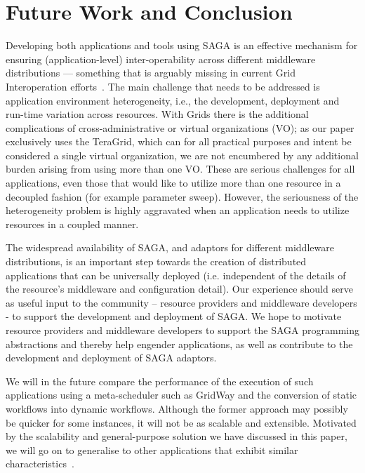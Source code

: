 \documentclass[conference,final]{IEEEtran}
\newcommand{\jha}[0]{}
\begin{document}

\section{Future Work and Conclusion}

Developing both applications and tools using SAGA is an effective
mechanism for ensuring (application-level) inter-operability across
different middleware distributions --- something that is arguably
missing in current Grid Interoperation efforts~\cite{gin_paper}. The
main challenge that needs to be addressed is application environment
heterogeneity, i.e., the development, deployment and run-time
variation across resources.  With Grids there is the additional
complications of cross-administrative or virtual organizations (VO);
as our paper exclusively uses the TeraGrid, which can for all
practical purposes and intent be considered a single virtual
organization, we are not encumbered by any additional burden arising
from using more than one VO.  These are serious challenges for all
applications, even those that would like to utilize more than one
resource in a decoupled fashion (for example parameter sweep).
However, the seriousness of the heterogeneity problem is highly
aggravated when an application needs to utilize resources in a coupled
manner.

The widespread availability of SAGA, and adaptors for different
middleware distributions, is an important step towards the creation of
distributed applications that can be universally deployed (i.e.
independent of the details of the resource's middleware and
configuration detail).  Our experience should serve as useful input to
the community -- resource providers and middleware developers - to
support the development and deployment of SAGA.  We hope to motivate
resource providers and middleware developers to support the SAGA
programming abstractions and thereby help engender applications, as
well as contribute to the development and deployment of SAGA adaptors.

We will in the future compare the performance of the execution of such
applications using a meta-scheduler such as GridWay and the conversion
of static workflows into dynamic workflows. Although the former
approach may possibly be quicker for some instances, it will not be as
scalable and extensible. Motivated by the scalability and
general-purpose solution we have discussed in this paper, we will go
on to generalise to other applications that exhibit similar
characteristics~\cite{nature99}.
\end{document}
